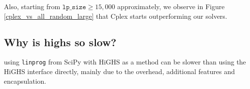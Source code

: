 Also, starting from $\texttt{lp\_size} \geq 15,000$ approximately, we observe in Figure
\ref{cplex_vs_all_random_large} that Cplex starts outperforming our solvers.
  
\subsection{Why is highs so slow?}
using \texttt{linprog} from SciPy with HiGHS as a method can be 
slower than using the HiGHS interface directly, mainly due to the overhead, 
additional features and encapsulation.

